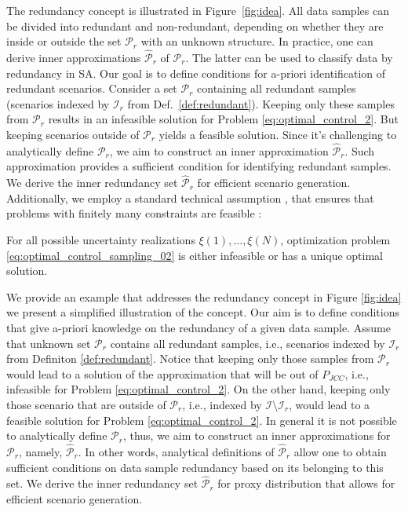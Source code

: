 The redundancy concept is illustrated in Figure~\ref{fig:idea}. All data samples can be divided into redundant and non-redundant, depending on whether they are inside or outside the set $\mathcal{P}_r$ with an unknown structure. In practice, one can derive inner approximations $\hat{\mathcal{P}}_r$ of $\mathcal{P}_r$. The latter can be used to classify data by redundancy in SA. Our goal is to define conditions for a-priori identification of redundant scenarios. Consider a set $\mathcal{P}_r$ containing all redundant samples (scenarios indexed by $\mathcal{I}_{r}$ from Def.~\ref{def:redundant}). Keeping only these samples from $\mathcal{P}_r$ results in an infeasible solution for Problem \eqref{eq:optimal_control_2}. But keeping scenarios outside of $\mathcal{P}_r$ yields a feasible solution. Since it's challenging to analytically define $\mathcal{P}_r$, we aim to construct an inner approximation $\hat{\mathcal{P}}_r$. Such approximation provides a sufficient condition for identifying redundant samples. We derive the inner redundancy set $\hat{\mathcal{P}}_r$ for efficient scenario generation. Additionally, we employ a standard technical assumption \cite{campi2011sampling},  that ensures that problems with finitely many constraints are feasible%
:
\begin{assumption}\label{asmp:10}
For all possible uncertainty realizations $\xi(1), \dots, \xi(N)$, optimization problem \eqref{eq:optimal_control_sampling_02} is either infeasible or has a unique optimal solution.
\end{assumption}
We provide an example that addresses the redundancy concept in Figure \ref{fig:idea} we present a simplified illustration of the concept. Our aim is to define conditions that give a-priori knowledge on the redundancy of a given data sample. Assume that unknown set $\mathcal{P}_r$ contains all redundant samples, i.e., scenarios indexed by $\mathcal{I}_{r}$ from Definiton \ref{def:redundant}. Notice that keeping only those samples from $\mathcal{P}_r$ would lead to a solution of the approximation that will be out of $P_{JCC}$, i.e., infeasible for Problem \eqref{eq:optimal_control_2}. On the other hand, keeping only those scenario that are outside of $\mathcal{P}_r$, i.e., indexed by $\mathcal{I} \setminus \mathcal{I}_r$, would lead to a feasible solution for Problem \eqref{eq:optimal_control_2}. In general it is not possible to analytically define $\mathcal{P}_r$, thus, we aim to construct an inner approximations for $\mathcal{P}_r$, namely, $\hat{\mathcal{P}}_r$. In other words, analytical definitions of $\hat{\mathcal{P}}_r$ allow one to obtain sufficient conditions on data sample redundancy based on its belonging to this set. We derive the inner redundancy set $\hat{\mathcal{P}}_r$ for proxy distribution that allows for efficient scenario generation. 

